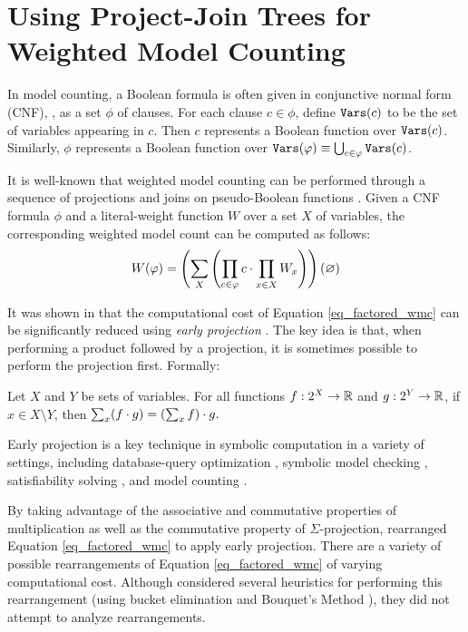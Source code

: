 \section{Using Project-Join Trees for Weighted Model Counting}
\label{sec_jointree}

In model counting, a Boolean formula is often given in conjunctive normal form (CNF), \ie, as a set $\phi$ of clauses.
For each clause $c \in \phi$, define $\texttt{\upshape Vars}(c)$ to be the set of variables appearing in $c$.
Then $c$ represents a Boolean function over $\texttt{\upshape Vars}(c)$. Similarly, $\phi$ represents a Boolean function over $\texttt{\upshape Vars}(\varphi) \equiv \bigcup_{c \in \varphi} \texttt{\upshape Vars}(c)$. 

It is well-known that weighted model counting can be performed through a sequence of projections and joins on pseudo-Boolean functions \cite{DPV20,DDV19}.
Given a CNF formula $\phi$ and a literal-weight function $W$ over a set $X$ of variables, the corresponding weighted model count can be computed as follows:
\begin{equation}
\label{eq_factored_wmc}
    W(\varphi) = \left( 
        \sum_X
        \left( \prod_{c \in \varphi} c \cdot \prod_{x \in X} W_x \right)
     \right)(\varnothing)
\end{equation}

It was shown in \cite{DPV20} that the computational cost of Equation \ref{eq_factored_wmc} can be significantly reduced using \emph{early projection} \cite{MPPV04}. The key idea is that, when performing a product followed by a projection, it is sometimes possible to perform the projection first. Formally:
\begin{theorem}
\label{thm_early_proj}
    Let $X$ and $Y$ be sets of variables.
    For all functions $f: 2^X \to \mathbb{R}$ and $g: 2^Y \to \mathbb{R}$, if $x \in X \setminus Y$, then $\sum_x (f \cdot g) = \left( \sum_x f \right) \cdot g.$
\end{theorem}
Early projection is a key technique in symbolic computation in a variety of settings, including database-query optimization \cite{KV00}, symbolic model checking \cite{burch1991symbolic}, satisfiability solving \cite{pan2005symbolic}, and model counting \cite{DPV20}.

By taking advantage of the associative and commutative properties of multiplication as well as the commutative property of $\Sigma$-projection, \cite{DPV20} rearranged Equation \eqref{eq_factored_wmc} to apply early projection.
There are a variety of possible rearrangements of Equation \eqref{eq_factored_wmc} of varying computational cost.
Although \cite{DPV20} considered several heuristics for performing this rearrangement (using bucket elimination \cite{dechter99} and Bouquet's Method \cite{bouquet1999gestion}), they did not attempt to analyze rearrangements.


